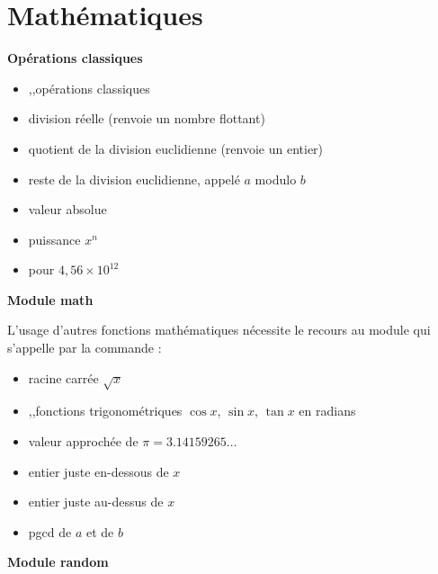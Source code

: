 \documentclass[11pt,class=report,crop=false]{standalone}
\begin{document}


\section{Mathématiques}

\textbf{Opérations classiques}
\begin{itemize}
  \item {},\quad {},\quad {}\quad  opérations classiques
  \item {}\quad division \og{}réelle\fg{} (renvoie un nombre flottant)
  \item {}\quad quotient de la division euclidienne (renvoie un entier)
  \item {}\quad reste de la division euclidienne, appelé $a$ modulo $b$
  \item {}\quad valeur absolue
  \item {}\quad puissance $x^n$
  \item {}\quad pour $4,56 \times 10^{12}$
\end{itemize}

\bigskip

\textbf{Module \og{}math\fg{}}

L'usage d'autres fonctions mathématiques nécessite le recours au module  qui s'appelle par la commande :\\
\centerline{}

\begin{itemize}
  \item {}\quad racine carrée $\sqrt{x}$
  \item {},\quad {},\quad {}\quad fonctions trigonométriques $\cos x$, $\sin x$, $\tan x$ en radians
  \item {}\quad valeur approchée de $\pi = 3.14159265\ldots$
  \item {}\quad  entier juste en-dessous de $x$
  \item {}\quad  entier juste au-dessus de $x$
  \item {}\quad pgcd de $a$ et de $b$
 \end{itemize}
 \bigskip

\textbf{Module \og{}random\fg{}}
\end{document}
